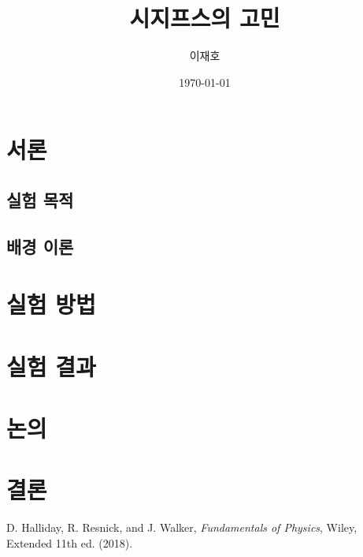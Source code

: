 \documentclass{physreport}
\title{시지프스의 고민}
\author{이재호}
\institute{서울대학교}
\date{\today}
\begin{document}
\maketitlepage
\maketitle

\begin{abstract}
  \lipsum[1]
\end{abstract}

\section{서론}
\subsection{실험 목적}
\lipsum[2]

\subsection{배경 이론}
\lipsum[3-5]

\section{실험 방법}
\lipsum[6-7]

\section{실험 결과}
\lipsum[8-10]

\section{논의}
\lipsum[11-12]

\section{결론}
\lipsum[13]

\begin{thebibliography}{99}
   D. Halliday, R. Resnick, and J. Walker, \emph{Fundamentals of Physics}, Wiley, Extended 11th ed. (2018).
\end{thebibliography}
\end{document}
